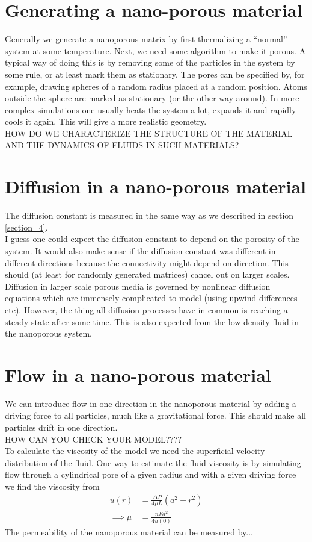 \documentclass[a4paper,english, 10pt, twoside]{article}
\begin{document}
\section{Generating a nano-porous material}
Generally we generate a nanoporous matrix by first thermalizing a ``normal'' system at some temperature. 
Next, we need some algorithm to make it porous. A typical way of doing this is by removing some of the particles 
in the system by some rule, or at least mark them as stationary. The pores can be specified by, for example, 
drawing spheres of a random radius placed at a random position. Atoms outside the sphere are marked as stationary 
(or the other way around). In more complex simulations one usually heats the system a lot, expands it and rapidly cools 
it again. This will give a more realistic geometry.\\
HOW DO WE CHARACTERIZE THE STRUCTURE OF THE MATERIAL AND THE DYNAMICS OF FLUIDS IN SUCH MATERIALS?

\section{Diffusion in a nano-porous material}
The diffusion constant is measured in the same way as we described in section \ref{section_4}. \\
I guess one could expect the diffusion constant to depend on the porosity of the system. 
It would also make sense if the diffusion constant was different in different directions because the connectivity might depend on direction. This 
should (at least for randomly generated matrices) cancel out on larger scales. \\
Diffusion in larger scale porous media is governed by nonlinear diffusion equations which are immensely complicated 
to model (using upwind differences etc). However, the thing all diffusion processes have in common is reaching a steady 
state after some time. This is also expected from the low density fluid in the nanoporous system.

\section{Flow in a nano-porous material}
We can introduce flow in one direction in the nanoporous material by adding a driving force to all particles, much like a gravitational force.
This should make all particles drift in one direction.\\
HOW CAN YOU CHECK YOUR MODEL????\\
To calculate the viscosity of the model we need the superficial velocity distribution of the fluid. One way to estimate the fluid viscosity is 
by simulating flow through a cylindrical pore of a given radius and with a given driving force we find the viscosity from
\begin{align*}
 u(r) &= \frac{\Delta P}{4\mu L}\left(a^2-r^2\right)\\
 \implies \mu &= \frac{nFa^2}{4u(0)}
\end{align*}
The permeability of the nanoporous material can be measured by...
\end{document}
